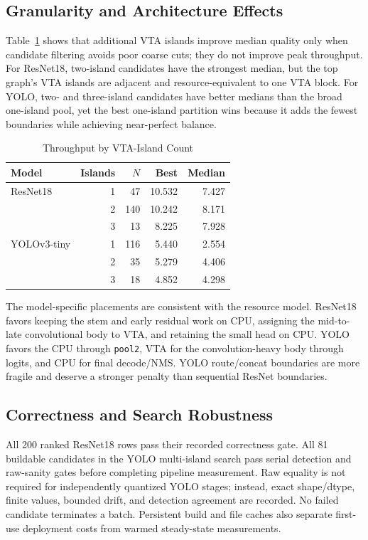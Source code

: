 \documentclass[conference]{IEEEtran}
\begin{document}
\subsection{Granularity and Architecture Effects}

Table~\ref{tab:granularity} shows that additional VTA islands improve median quality only when candidate filtering avoids poor coarse cuts; they do not improve peak throughput. For ResNet18, two-island candidates have the strongest median, but the top graph's VTA islands are adjacent and resource-equivalent to one VTA block. For YOLO, two- and three-island candidates have better medians than the broad one-island pool, yet the best one-island partition wins because it adds the fewest boundaries while achieving near-perfect balance.

\begin{table}[t]
\caption{Throughput by VTA-Island Count}
\label{tab:granularity}
\centering
\begin{tabular}{lrrrr}
\toprule
Model & Islands & $N$ & Best & Median\\
\midrule
ResNet18 & 1 & 47 & 10.532 & 7.427\\
 & 2 & 140 & 10.242 & 8.171\\
 & 3 & 13 & 8.225 & 7.928\\
\midrule
YOLOv3-tiny & 1 & 116 & 5.440 & 2.554\\
 & 2 & 35 & 5.279 & 4.406\\
 & 3 & 18 & 4.852 & 4.298\\
\bottomrule
\end{tabular}
\end{table}

The model-specific placements are consistent with the resource model. ResNet18 favors keeping the stem and early residual work on CPU, assigning the mid-to-late convolutional body to VTA, and retaining the small head on CPU. YOLO favors the CPU through \texttt{pool2}, VTA for the convolution-heavy body through logits, and CPU for final decode/NMS. YOLO route/concat boundaries are more fragile and deserve a stronger penalty than sequential ResNet boundaries.

\subsection{Correctness and Search Robustness}

All 200 ranked ResNet18 rows pass their recorded correctness gate. All 81 buildable candidates in the YOLO multi-island search pass serial detection and raw-sanity gates before completing pipeline measurement. Raw equality is not required for independently quantized YOLO stages; instead, exact shape/dtype, finite values, bounded drift, and detection agreement are recorded. No failed candidate terminates a batch. Persistent build and file caches also separate first-use deployment costs from warmed steady-state measurements.
\end{document}

